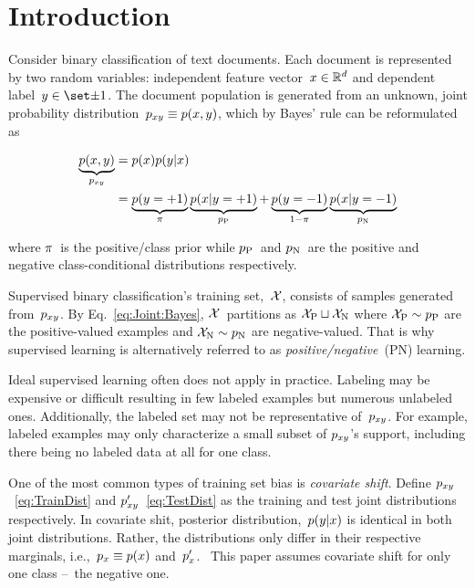 \documentclass[]{subfiles}
\begin{document}
\section{Introduction}\label{sec:Introduction}

Consider binary classification of text documents.  Each document is represented by two random variables: independent feature vector~${x \in \mathbb{R}^{d}}$ and dependent label~${\y \in \domainY}$. The document population is generated from an unknown, joint probability distribution~${p_{xy} \equiv p(x,y)}$, which by Bayes' rule can be reformulated as

\begin{align}
  \underbrace{p(x,y)}_{p_{xy}} &= p(x) p(y \vert x) \label{eq:TrainDist} \\
           &= \underbrace{p(y = {+}1)}_{\pi} \underbrace{p(x \vert y = {+}1)}_{p_{\textnormal{P}}} + \underbrace{p(y = {-}1)}_{1-\pi} \underbrace{p(x \vert y = {-}1)}_{p_{\textnormal{N}}} \label{eq:Joint:Bayes}
\end{align}

\noindent
where $\pi$~is the positive\-/class prior while $p_{\textnormal{P}}$~and $p_{\textnormal{N}}$~are the positive and negative class-conditional distributions respectively.

Supervised binary classification's training set,~$\mathcal{X}$, consists of samples generated from~$p_{xy}$. By Eq.~\eqref{eq:Joint:Bayes}, $\mathcal{X}$~partitions as ${\mathcal{X}_{\textnormal{P}} \sqcup \mathcal{X}_{\textnormal{N}}}$ where ${\mathcal{X}_{\textnormal{P}} \sim p_{\textnormal{P}}}$ are the positive-valued examples and ${\mathcal{X}_{\textnormal{N}} \sim p_{\textnormal{N}}}$ are negative-valued.  That is why supervised learning is alternatively referred to as \textit{positive\-/negative}~(PN) learning.

Ideal supervised learning often does not apply in practice.  Labeling may be expensive or difficult resulting in few labeled examples but numerous unlabeled ones.  Additionally, the labeled set may not be representative of~$p_{xy}$.  For example, labeled examples may only characterize a small subset of $p_{xy}$'s support, including there being no labeled data at all for one class.

One of the most common types of training set bias is \textit{covariate shift}. Define $p_{xy}$~\eqref{eq:TrainDist} and ${p_{xy}'}$~\eqref{eq:TestDist} as the training and test joint distributions respectively.  In covariate shit, posterior distribution,~${p(y \vert x)}$ is identical in both joint distributions. Rather, the distributions only differ in their respective marginals, i.e.,~${p_{x} \equiv p(x)}$ and~$p_{x}'$.~\cite{Huang:2006}  This paper assumes covariate shift for only one class --~the negative one.
\end{document}
